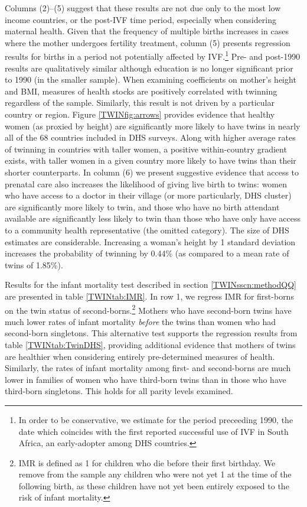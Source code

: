 Columns (2)--(5) suggest that these results are not due only to the most low 
income countries, or the post-IVF time period, especially when considering 
maternal health.  Given that the frequency of multiple births increases in 
cases where the mother undergoes fertility treatment, column (5) presents 
regression results for births in a period not potentially affected by 
IVF.\footnote{In order to be conservative, we estimate for the period 
preceeding 1990, the date which coincides with the first reported successful 
use of IVF in South Africa, an early-adopter among DHS countries.}  Pre- and 
post-1990 results are qualitatively similar although education is no longer 
significant prior to 1990 (in the smaller sample). When examining coefficients
on mother's height and BMI, measures of health stocks are positively correlated 
with twinning regardless of the sample.  Similarly, this result is not driven 
by a particular country or region.  Figure \ref{TWINfig:arrows} provides 
evidence that healthy women (as proxied by height) are significantly more 
likely to have twins in nearly all of the 68 countries included in DHS surveys.  
Along with higher average rates of twinning in countries with taller women, a 
positive within-country gradient exists, with taller women in a given country 
more likely to have twins than their shorter counterparts.  In column (6) we
present suggestive evidence that access to prenatal care also increases the 
likelihood of giving live birth to twins: women who have access to a doctor in
their village (or more particularly, DHS cluster) are significantly more likely 
to twin, and those who have no birth attendant available are significantly less 
likely to twin than those who have only have access to a community health 
representative (the omitted category). The size of DHS estimates are 
considerable. Increasing a woman's height by 1 standard deviation increases the 
probability of twinning by 0.44\% (as compared to a mean rate of twins of 
1.85\%).

Results for the infant mortality test described in section \ref{TWINsscn:methodQQ} 
are presented in table \ref{TWINtab:IMR}. In row 1, we regress IMR for first-borns
on the twin status of second-borns.\footnote{IMR is defined as 1 for children
who die before their first birthday.  We remove from the sample any children who
were not yet 1 at the time of the following birth, as these children have not
yet been entirely exposed to the risk of infant mortality.}  Mothers who have 
second-born twins have much lower rates of infant mortality \emph{before} the 
twins than women who had second-born singletons.  This alternative test supports
the regression results from table \ref{TWINtab:TwinDHS}, providing additional 
evidence that mothers of twins are healthier when considering entirely 
pre-determined measures of health. Similarly, the rates of infant mortality among 
first- and second-borns are much lower in families of women who have third-born 
twins than in those who have third-born singletons.  This holds for all parity 
levels examined.

